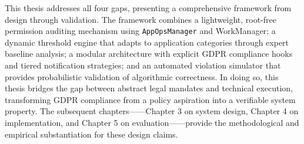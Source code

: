 This thesis addresses all four gaps, presenting a comprehensive framework from design through validation. The framework combines a lightweight, root-free permission auditing mechanism using \texttt{AppOpsManager} and WorkManager; a dynamic threshold engine that adapts to application categories through expert baseline analysis; a modular architecture with explicit GDPR compliance hooks and tiered notification strategies; and an automated violation simulator that provides probabilistic validation of algorithmic correctness. In doing so, this thesis bridges the gap between abstract legal mandates and technical execution, transforming GDPR compliance from a policy aspiration into a verifiable system property. The subsequent chapters——Chapter 3 on system design, Chapter 4 on implementation, and Chapter 5 on evaluation——provide the methodological and empirical substantiation for these design claims.